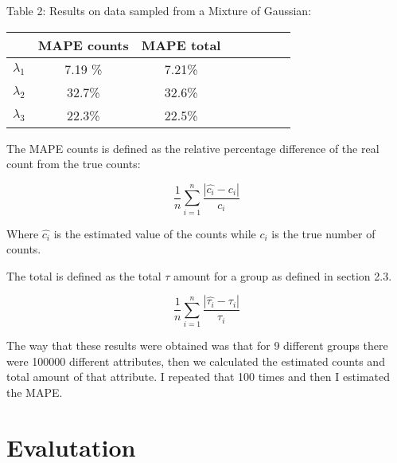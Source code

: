 \documentclass[a4paper]{article}
\begin{document}
Table 2: Results on data sampled from a Mixture of Gaussian:

\begin{tabular}{l*{6}{c}r}
  & MAPE counts & MAPE total  \\
\hline
$\lambda_1$ & 7.19 \% &  7.21\% \\
$\lambda_2$  & 32.7\% & 32.6\%   \\
$\lambda_3$  & 22.3\% & 22.5\%    \\
\end{tabular}

The MAPE counts is defined as the relative percentage difference of the real count from the true counts:

$$\frac{1}{n}\sum^{n}_{i=1}\frac{|\hat{c_i} - c_i|}{c_i}$$

Where $\hat{c_i}$ is the estimated value of the counts while $c_i$ is the true number of counts.

The total is defined as the total $\tau$ amount for a group as defined in section 2.3.  

$$\frac{1}{n}\sum^{n}_{i=1}\frac{|\hat{\tau_i} - \tau_i|}{\tau_i}$$

The way that these results were obtained was that for 9 different groups there were 100000 different attributes, then we calculated the estimated counts and total amount of that attribute.
I repeated that 100 times and then I estimated the MAPE.

\section{Evalutation}
\end{document}
